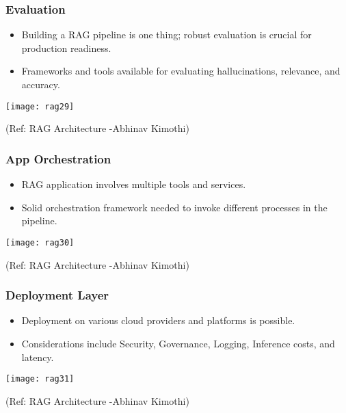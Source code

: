 \begin{frame}[fragile]\frametitle{Evaluation}
    \begin{itemize}
        \item Building a RAG pipeline is one thing; robust evaluation is crucial for production readiness.
        \item Frameworks and tools available for evaluating hallucinations, relevance, and accuracy.
    \end{itemize}
	
	\begin{center}
	\texttt{[image: rag29]}
	
	{\tiny (Ref: RAG Architecture -Abhinav  Kimothi)}
	\end{center}			
\end{frame}

\begin{frame}[fragile]\frametitle{App Orchestration}
    \begin{itemize}
        \item RAG application involves multiple tools and services.
        \item Solid orchestration framework needed to invoke different processes in the pipeline.
    \end{itemize}
	
	\begin{center}
	\texttt{[image: rag30]}
	
	{\tiny (Ref: RAG Architecture -Abhinav  Kimothi)}
	\end{center}		
\end{frame}

\begin{frame}[fragile]\frametitle{Deployment Layer}
    \begin{itemize}
        \item Deployment on various cloud providers and platforms is possible.
        \item Considerations include Security, Governance, Logging, Inference costs, and latency.
    \end{itemize}
	
	\begin{center}
	\texttt{[image: rag31]}
	
	{\tiny (Ref: RAG Architecture -Abhinav  Kimothi)}
	\end{center}
	
\end{frame}

